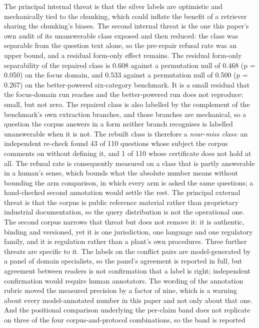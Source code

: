 \documentclass[preprint,3p,times]{elsarticle}
\begin{document}
The principal internal threat is that the silver labels are optimistic and
mechanically tied to the chunking, which could inflate the benefit of a
retriever sharing the chunking's biases. The second internal threat is the
one this paper's own audit of its unanswerable class exposed and then
reduced: the class was separable from the question text alone, so the
pre-repair refusal rate was an upper bound, and a residual form-only effect
remains. The residual form-only separability of the repaired class is 0.608 against a permutation null of 0.468 (p = 0.050) on the focus domain, and 0.533 against a permutation null of 0.500 (p = 0.267) on the better-powered six-category benchmark. It is a small residual that the focus-domain run reaches and the better-powered run does not reproduce: small, but not zero. The repaired class is also labelled by the complement of the
benchmark's own extraction branches, and those branches are mechanical, so a
question the corpus answers in a form neither branch recognises is labelled
unanswerable when it is not. The rebuilt class is therefore a \emph{near-miss
class}: an independent re-check found 43 of 110 questions
whose subject the corpus comments on without
defining it, and 1 of 110 whose certificate does not hold at
all. The refusal rate is consequently measured on a class that is partly
answerable in a human's sense, which bounds what the absolute number means
without bounding the arm comparison, in which every arm is asked the same
questions; a hand-checked second annotation would settle the rest. The principal external threat is that
the corpus is public reference material rather than proprietary industrial
documentation, so the query distribution is not the operational one. The
second corpus narrows that threat but does not remove it: it is authentic,
binding and versioned, yet it is one jurisdiction, one language and one
regulatory family, and it is regulation rather than a plant's own procedures.
Three further threats are specific to it. The labels on the conflict pairs
are model-generated by a panel of domain specialists, so the panel's
agreement is reported in full, but agreement between readers is not
confirmation that a label is right; independent confirmation would require
human annotators. The wording of the annotation rubric moved the measured
precision by a factor of nine, which is a warning about every
model-annotated number in this paper and not only about that one. And the
positional comparison underlying the per-claim band does not replicate on
three of the four corpus-and-protocol combinations, so the band is reported
\end{document}
